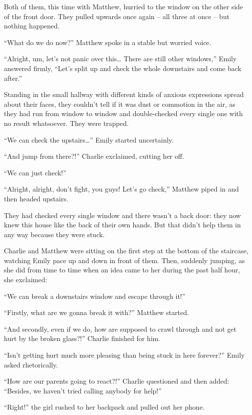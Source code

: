Both of them, this time with Matthew, hurried to the window on the other side of the front door. They pulled upwards once again – all three at once – but nothing happened.

“What do we do now?” Matthew spoke in a stable but worried voice.

“Alright, um, let's not panic over this… There are still other windows,” Emily answered firmly, “Let's split up and check the whole downstairs and come back after.”

\bigskip

Standing in the small hallway with different kinds of anxious expressions spread about their faces, they couldn't tell if it was dust or commotion in the air, as they had run from window to window and double-checked every single one with no result whatsoever. They were trapped.

“We can check the upstairs…” Emily started uncertainly.

“And jump from there?!” Charlie exclaimed, cutting her off.

“We can just check!”

“Alright, alright, don't fight, you guys! Let's go check,” Matthew piped in and then headed upstairs.

\bigskip

They had checked every single window and there wasn't a back door: they now knew this house like the back of their own hands. But that didn't help them in any way because they were stuck.

Charlie and Matthew were sitting on the first step at the bottom of the staircase, watching Emily pace up and down in front of them. Then, suddenly jumping, as she did from time to time when an idea came to her during the past half hour, she exclaimed:

“We can break a downstairs window and escape through it!”

“Firstly, what are we gonna break it with?” Matthew started.

“And secondly, even if we do, how are supposed to crawl through and not get hurt by the broken glass?!” Charlie finished for him.

“Isn't getting hurt much more pleasing than being stuck in here forever?” Emily asked rhetorically.

“How are our parents going to react?!” Charlie questioned and then added: “Besides, we haven't tried calling anybody for help!”

“Right!” the girl rushed to her backpack and pulled out her phone.

